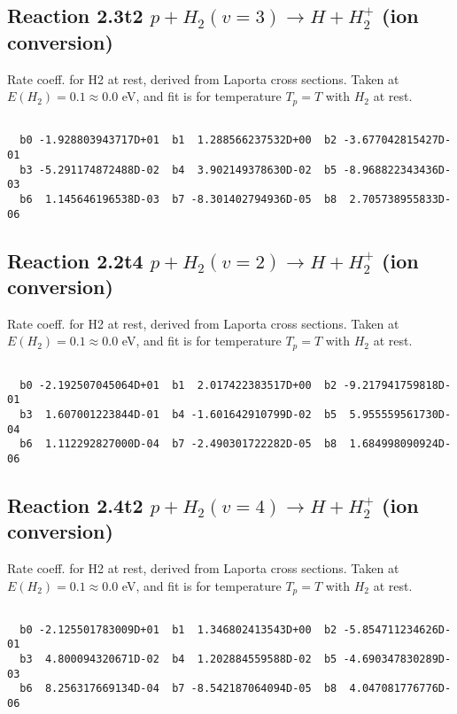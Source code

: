 \documentclass[12pt,dvipdfmx]{article}
\begin{document}
\newpage
\subsection{
Reaction 2.3t2
$ p + H_2(v=3) \rightarrow H + H_2^+$ (ion conversion)
}
Rate coeff. for H2 at rest, derived from Laporta cross sections.
Taken at $E(H_2) = 0.1 \approx 0.0$ eV,  and fit is for temperature $T_p=T$ with $H_2$ at rest.

\begin{small}\begin{verbatim}

  b0 -1.928803943717D+01  b1  1.288566237532D+00  b2 -3.677042815427D-01
  b3 -5.291174872488D-02  b4  3.902149378630D-02  b5 -8.968822343436D-03
  b6  1.145646196538D-03  b7 -8.301402794936D-05  b8  2.705738955833D-06

\end{verbatim}\end{small}

\newpage
\subsection{
Reaction 2.2t4
$ p + H_2(v=2) \rightarrow H + H_2^+$ (ion conversion)
}
Rate coeff. for H2 at rest, derived from Laporta cross sections.
Taken at $E(H_2) = 0.1 \approx 0.0$ eV,  and fit is for temperature $T_p=T$ with $H_2$ at rest.

\begin{small}\begin{verbatim}

  b0 -2.192507045064D+01  b1  2.017422383517D+00  b2 -9.217941759818D-01
  b3  1.607001223844D-01  b4 -1.601642910799D-02  b5  5.955559561730D-04
  b6  1.112292827000D-04  b7 -2.490301722282D-05  b8  1.684998090924D-06

\end{verbatim}\end{small}

\newpage
\subsection{
Reaction 2.4t2
$ p + H_2(v=4) \rightarrow H + H_2^+$ (ion conversion)
}
Rate coeff. for H2 at rest, derived from Laporta cross sections.
Taken at $E(H_2) = 0.1 \approx 0.0$ eV,  and fit is for temperature $T_p=T$ with $H_2$ at rest.

\begin{small}\begin{verbatim}

  b0 -2.125501783009D+01  b1  1.346802413543D+00  b2 -5.854711234626D-01
  b3  4.800094320671D-02  b4  1.202884559588D-02  b5 -4.690347830289D-03
  b6  8.256317669134D-04  b7 -8.542187064094D-05  b8  4.047081776776D-06

\end{verbatim}\end{small}
\end{document}
